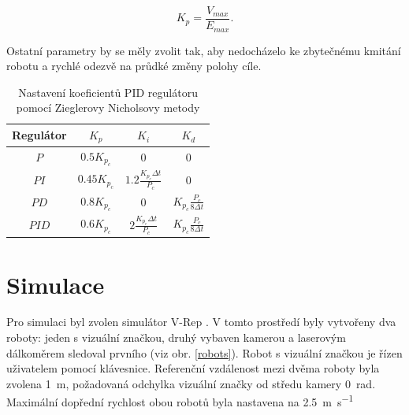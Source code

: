 \documentclass[twoside]{ctuthesis}
\theoremstyle{plain}
\theoremstyle{definition}
\theoremstyle{note}
\begin{document}
\begin{equation}
K_p = \frac{V_{max}}{E_{max}}.
\end{equation}

Ostatní parametry by se měly zvolit tak, aby nedocházelo ke zbytečnému kmitání robotu a rychlé odezvě na průdké změny polohy cíle.


\begin{table}[hbt]
	\centering
	\caption{Nastavení koeficientů PID regulátoru pomocí Zieglerovy Nicholsovy metody}
	\label{koef}
	\begin{tabular}{|c|c|c|c|}
		\hline
		\rowcolor[HTML]{C0C0C0} 
		Regulátor & $K_p$         & $K_i$                            & $K_d$                          \\ \hline
		$P$       & $0.5K_{p_c}$  & 0                                & 0                              \\ \hline
		$PI$      & $0.45K_{p_c}$ & $1.2\frac{K_{p_c}\Delta t}{P_c}$ & 0                              \\ \hline
		$PD$      & $0.8K_{p_c}$    & 0                                & $K_{p_c}\frac{P_c}{8\Delta t}$ \\ \hline
		$PID$     & $0.6K_{p_c}$  & $2\frac{K_{p_c}\Delta t}{P_c}$   & $K_{p_c}\frac{P_c}{8\Delta t}$ \\ \hline
	\end{tabular}
\end{table}
\chapter{Simulace}
\label{simulace}

Pro simulaci byl zvolen simulátor V-Rep \cite{cite:15}. V tomto prostředí byly vytvořeny dva roboty: jeden s vizuální značkou, druhý vybaven kamerou a laserovým dálkoměrem sledoval prvního (viz obr. \ref{robots}). Robot s vizuální značkou je řízen uživatelem pomocí klávesnice. Referenční vzdálenost mezi dvěma roboty byla zvolena \SI{1}{\meter}, požadovaná odchylka vizuální značky od středu kamery \SI{0}{\radian}. Maximální dopřední rychlost obou robotů byla nastavena na \SI{2.5}{\meter\per\second}
\end{document}
